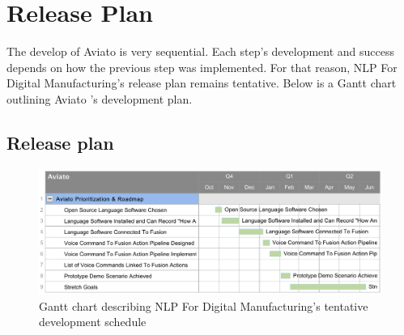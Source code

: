 \documentclass[onecolumn, draftclsnofoot,10pt, compsoc]{IEEEtran}
\def \CapstoneProjectName{NLP For Digital Manufacturing}
\def \botname{Aviato }
\begin{document}
\section{Release Plan}
	The develop of \botname is very sequential. Each step's development and success depends on how the previous step was implemented. For that reason, \CapstoneProjectName's release plan remains tentative. Below is a Gantt chart outlining \botname's development plan.
    \subsection{Release plan}
    	\begin{figure}[H]
    		\includegraphics[width=1\textwidth]{ganttChart.png}
    		\centering
    		\caption{Gantt chart describing \CapstoneProjectName's tentative development schedule}
   			\label{fig:mesh1}
    	\end{figure}


% 
%
\end{document}
